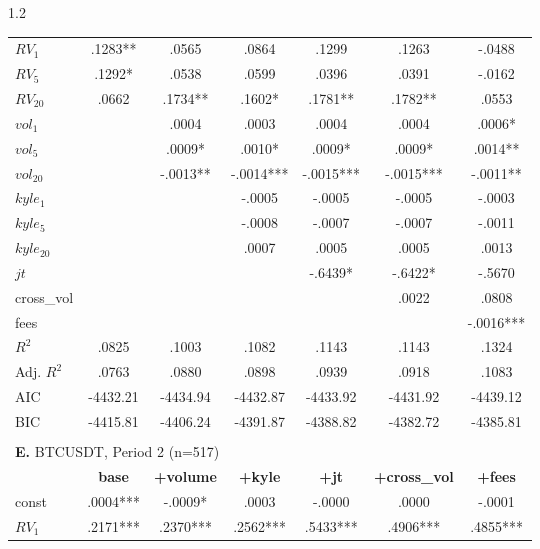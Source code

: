 \documentclass[10pt]{article}
\begin{document}
\begin{setstretch}{1.2}
\begin{small}
\begin{longtable}{l*{6}{c}}
$RV_1$ & \hfil .1283** & \hfil .0565 & \hfil .0864 & \hfil .1299 & \hfil .1263 & \hfil -.0488 \\
$RV_5$ & \hfil .1292* & \hfil .0538 & \hfil .0599 & \hfil .0396 & \hfil .0391 & \hfil -.0162 \\
$RV_{20}$ & \hfil .0662 & \hfil .1734** & \hfil .1602* & \hfil .1781** & \hfil .1782** & \hfil .0553 \\
$vol_1$ & & \hfil .0004 & \hfil .0003 & \hfil .0004 & \hfil .0004 & \hfil .0006* \\
$vol_5$ & & \hfil .0009* & \hfil .0010* & \hfil .0009* & \hfil .0009* & \hfil .0014** \\
$vol_{20}$ & & \hfil -.0013** & \hfil -.0014*** & \hfil -.0015*** & \hfil -.0015*** & \hfil -.0011** \\
$kyle_1$ & & & \hfil -.0005 & \hfil -.0005 & \hfil -.0005 & \hfil -.0003 \\
$kyle_5$ & & & \hfil -.0008 & \hfil -.0007 & \hfil -.0007 & \hfil -.0011 \\
$kyle_{20}$ & & & \hfil .0007 & \hfil .0005 & \hfil .0005 & \hfil .0013 \\
$jt$ & & & & \hfil -.6439* & \hfil -.6422* & \hfil -.5670 \\
cross\_vol & & & & & \hfil .0022 & \hfil .0808 \\
fees & & & & & & \hfil -.0016*** \\
\hline
$R^2$ & \hfil .0825 & \hfil .1003 & \hfil .1082 & \hfil .1143 & \hfil .1143 & \hfil .1324 \\
Adj. $R^2$ & \hfil .0763 & \hfil .0880 & \hfil .0898 & \hfil .0939 & \hfil .0918 & \hfil .1083 \\
AIC & \hfil -4432.21 & \hfil -4434.94 & \hfil -4432.87 & \hfil -4433.92 & \hfil -4431.92 & \hfil -4439.12 \\
BIC & \hfil -4415.81 & \hfil -4406.24 & \hfil -4391.87 & \hfil -4388.82 & \hfil -4382.72 & \hfil -4385.81 \\
\hline
\\[64pt] %
\multicolumn{7}{l}{\textbf{E.} BTCUSDT, Period 2 (n=517)} \\
& \textbf{base} & \textbf{+volume} & \textbf{+kyle} & \textbf{+jt} & \textbf{+cross\_vol} & \textbf{+fees} \\
\hline
const & \hfil .0004*** & \hfil -.0009* & \hfil .0003 & \hfil -.0000 & \hfil .0000 & \hfil -.0001 \\
$RV_1$ & \hfil .2171*** & \hfil .2370*** & \hfil .2562*** & \hfil .5433*** & \hfil .4906*** & \hfil .4855*** \\

\end{longtable}
\end{small}
\end{setstretch}
\end{document}
